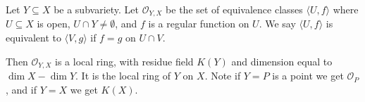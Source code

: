 Let $Y \subseteq X$ be a subvariety. Let $\mathcal{O}_{Y,X}$ be the set of equivalence classes $\langle U, f \rangle$ where $U \subseteq X$ is open, $U \cap Y \neq \emptyset$, and $f$ is a regular function on $U$. We say $\langle U, f \rangle$ is equivalent to $\langle V, g \rangle$ if $f = g$ on $U \cap V$.

Then $\mathcal{O}_{Y,X}$ is a local ring, with residue field $K(Y)$ and dimension equal to $\dim X - \dim Y$. It is the local ring of $Y$ on $X$. Note if $Y = P$ is a point we get $\mathcal{O}_P$, and if $Y = X$ we get $K(X)$.
